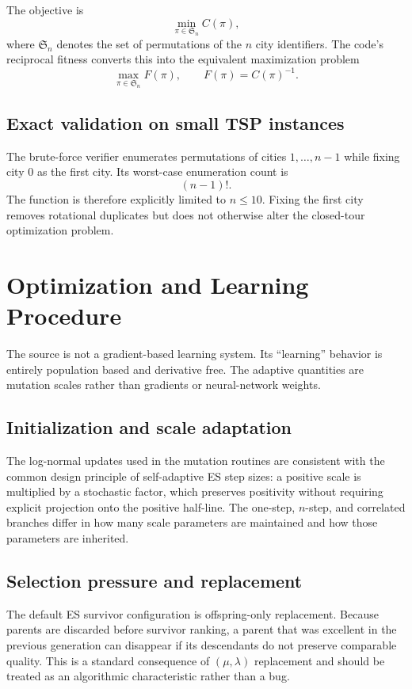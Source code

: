 \documentclass[11pt,a4paper]{article}
\begin{document}
The objective is
\begin{equation}
\min_{\pi\in\mathfrak{S}_n} C(\pi),
\end{equation}
where $\mathfrak{S}_n$ denotes the set of permutations of the $n$ city identifiers. The code's reciprocal fitness converts this into the equivalent maximization problem
\begin{equation}
\max_{\pi\in\mathfrak{S}_n} F(\pi),
\qquad F(\pi)=C(\pi)^{-1}.
\end{equation}

\subsection{Exact validation on small TSP instances}
The brute-force verifier enumerates permutations of cities $1,\ldots,n-1$ while fixing city 0 as the first city. Its worst-case enumeration count is
\begin{equation}
(n-1)!.
\end{equation}
The function is therefore explicitly limited to $n\leq 10$. Fixing the first city removes rotational duplicates but does not otherwise alter the closed-tour optimization problem.

\section{Optimization and Learning Procedure}
The source is not a gradient-based learning system. Its ``learning'' behavior is entirely population based and derivative free. The adaptive quantities are mutation scales rather than gradients or neural-network weights.

\subsection{Initialization and scale adaptation}
The log-normal updates used in the mutation routines are consistent with the common design principle of self-adaptive ES step sizes: a positive scale is multiplied by a stochastic factor, which preserves positivity without requiring explicit projection onto the positive half-line. The one-step, $n$-step, and correlated branches differ in how many scale parameters are maintained and how those parameters are inherited.

\subsection{Selection pressure and replacement}
The default ES survivor configuration is offspring-only replacement. Because parents are discarded before survivor ranking, a parent that was excellent in the previous generation can disappear if its descendants do not preserve comparable quality. This is a standard consequence of $(\mu,\lambda)$ replacement and should be treated as an algorithmic characteristic rather than a bug.
\end{document}
